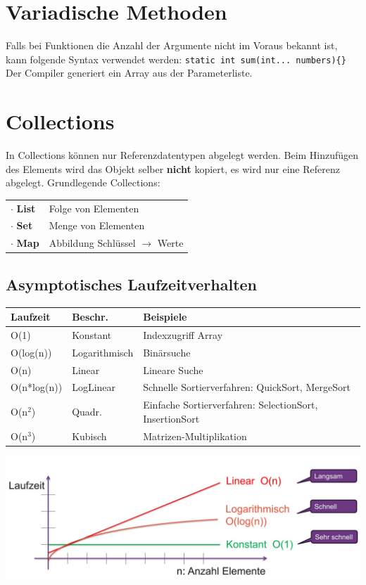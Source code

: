 \section{Variadische Methoden}
Falls bei Funktionen die Anzahl der Argumente nicht im Voraus bekannt ist, kann folgende
Syntax verwendet werden: \verb|static int sum(int... numbers){}|\\
Der Compiler generiert ein Array aus der Parameterliste.

\section{Collections}{\label{Collections}}
In Collections können nur Referenzdatentypen abgelegt werden. Beim Hinzufügen des Elements wird das Objekt selber \textbf{nicht} kopiert,
es wird nur eine Referenz abgelegt. Grundlegende Collections:
\begin{tabular}{l l}
    $\cdot$ \textbf{List} & Folge von Elementen \\
    $\cdot$ \textbf{Set}  & Menge von Elementen \\
    $\cdot$ \textbf{Map}  & Abbildung Schlüssel $\rightarrow$ Werte \\
\end{tabular}

\subsection{Asymptotisches Laufzeitverhalten}
\begin{tabularx}{\linewidth}{l l X} \hline
    \textbf{Laufzeit} & \textbf{Beschr.} & \textbf{Beispiele} \\ \hline
    O(1)        & Konstant      & Indexzugriff Array \\
    O(log(n))   & Logarithmisch & Binärsuche \\
    O(n)        & Linear        & Lineare Suche \\
    O(n*log(n)) & LogLinear     & Schnelle Sortierverfahren: QuickSort, MergeSort \\
    O(n$^2$)    & Quadr.        & Einfache Sortierverfahren: SelectionSort, InsertionSort \\
    O(n$^3$)    & Kubisch       & Matrizen-Multiplikation \\
\end{tabularx}

\includegraphics[width=\columnwidth]{pictures/laufzeit-collections.jpg}


